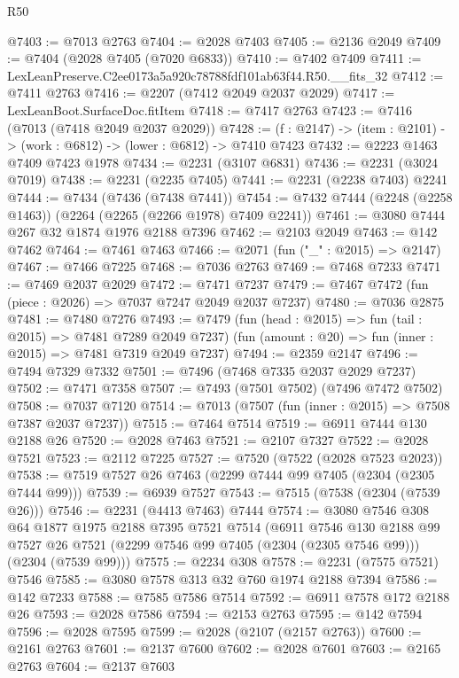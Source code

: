 \begin{lexlean}{R50}
\begin{coremodule}
@7403 := @7013 @2763
@7404 := @2028 @7403
@7405 := @2136 @2049
@7409 := @7404 (@2028 @7405 (@7020 @6833))
@7410 := @7402 @7409
@7411 := LexLeanPreserve.C2ee0173a5a920c78788fdf101ab63f44.R50.__fits_32
@7412 := @7411 @2763
@7416 := @2207 (@7412 @2049 @2037 @2029)
@7417 := LexLeanBoot.SurfaceDoc.fitItem
@7418 := @7417 @2763
@7423 := @7416 (@7013 (@7418 @2049 @2037 @2029))
@7428 := (f : @2147) -> (item : @2101) -> (work : @6812) -> (lower : @6812) -> @7410 @7423
@7432 := @2223 @1463 @7409 @7423 @1978
@7434 := @2231 (@3107 @6831)
@7436 := @2231 (@3024 @7019)
@7438 := @2231 (@2235 @7405)
@7441 := @2231 (@2238 @7403) @2241
@7444 := @7434 (@7436 (@7438 @7441))
@7454 := @7432 @7444 (@2248 (@2258 @1463)) (@2264 (@2265 (@2266 @1978) @7409 @2241))
@7461 := @3080 @7444 @267 @32 @1874 @1976 @2188 @7396
@7462 := @2103 @2049
@7463 := @142 @7462
@7464 := @7461 @7463
@7466 := @2071 (fun ("_" : @2015) => @2147)
@7467 := @7466 @7225
@7468 := @7036 @2763
@7469 := @7468 @7233
@7471 := @7469 @2037 @2029
@7472 := @7471 @7237
@7479 := @7467 @7472 (fun (piece : @2026) => @7037 @7247 @2049 @2037 @7237)
@7480 := @7036 @2875
@7481 := @7480 @7276
@7493 := @7479
    (fun (head : @2015) => fun (tail : @2015) => @7481 @7289 @2049 @7237)
    (fun (amount : @20) => fun (inner : @2015) => @7481 @7319 @2049 @7237)
@7494 := @2359 @2147
@7496 := @7494 @7329 @7332
@7501 := @7496 (@7468 @7335 @2037 @2029 @7237)
@7502 := @7471 @7358
@7507 := @7493 (@7501 @7502) (@7496 @7472 @7502)
@7508 := @7037 @7120
@7514 := @7013 (@7507 (fun (inner : @2015) => @7508 @7387 @2037 @7237))
@7515 := @7464 @7514
@7519 := @6911 @7444 @130 @2188 @26
@7520 := @2028 @7463
@7521 := @2107 @7327
@7522 := @2028 @7521
@7523 := @2112 @7225
@7527 := @7520 (@7522 (@2028 @7523 @2023))
@7538 := @7519 @7527 @26 @7463 (@2299 @7444 @99 @7405 (@2304 (@2305 @7444 @99)))
@7539 := @6939 @7527
@7543 := @7515 (@7538 (@2304 (@7539 @26)))
@7546 := @2231 (@4413 @7463) @7444
@7574 := @3080
    @7546
    @308
    @64
    @1877
    @1975
    @2188
    @7395
    @7521
    @7514
    (@6911
      @7546
      @130
      @2188
      @99
      @7527
      @26
      @7521
      (@2299 @7546 @99 @7405 (@2304 (@2305 @7546 @99)))
      (@2304 (@7539 @99)))
@7575 := @2234 @308
@7578 := @2231 (@7575 @7521) @7546
@7585 := @3080 @7578 @313 @32 @760 @1974 @2188 @7394
@7586 := @142 @7233
@7588 := @7585 @7586 @7514
@7592 := @6911 @7578 @172 @2188 @26
@7593 := @2028 @7586
@7594 := @2153 @2763
@7595 := @142 @7594
@7596 := @2028 @7595
@7599 := @2028 (@2107 (@2157 @2763))
@7600 := @2161 @2763
@7601 := @2137 @7600
@7602 := @2028 @7601
@7603 := @2165 @2763
@7604 := @2137 @7603

\end{coremodule}
\end{lexlean}
